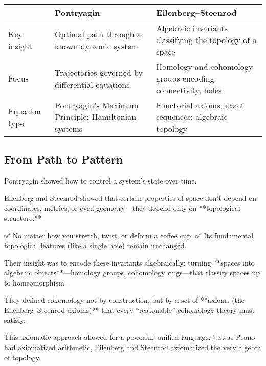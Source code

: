 \begin{tcolorbox}[colback=gray!5!white, colframe=black, title=\textbf{Sidebar: The Shift from Pontryagin to Eilenberg–Steenrod}, fonttitle=\bfseries, arc=1.5mm, boxrule=0.4pt]

\begin{tabular}{>{\raggedright}p{4cm} >{\raggedright}p{5.5cm} >{\raggedright\arraybackslash}p{5.5cm}}
 & \textbf{Pontryagin} & \textbf{Eilenberg–Steenrod} \\
\midrule
Key insight & Optimal path through a known dynamic system & Algebraic invariants classifying the topology of a space \\
Focus & Trajectories governed by differential equations & Homology and cohomology groups encoding connectivity, holes \\
Equation type & Pontryagin’s Maximum Principle; Hamiltonian systems & Functorial axioms; exact sequences; algebraic topology
\end{tabular}

\end{tcolorbox}

\bigskip

\subsection*{From Path to Pattern}

Pontryagin showed how to control a system’s state over time.

Eilenberg and Steenrod showed that certain properties of space don’t depend on coordinates, metrics, or even geometry—they depend only on **topological structure.**

✅ No matter how you stretch, twist, or deform a coffee cup,  
✅ Its fundamental topological features (like a single hole) remain unchanged.

Their insight was to encode these invariants algebraically:  
turning **spaces into algebraic objects**—homology groups, cohomology rings—that classify spaces up to homeomorphism.

They defined cohomology not by construction,  
but by a set of **axioms (the Eilenberg–Steenrod axioms)** that every “reasonable” cohomology theory must satisfy.

This axiomatic approach allowed for a powerful, unified language:  
just as Peano had axiomatized arithmetic,  
Eilenberg and Steenrod axiomatized the very algebra of topology.

\bigskip

